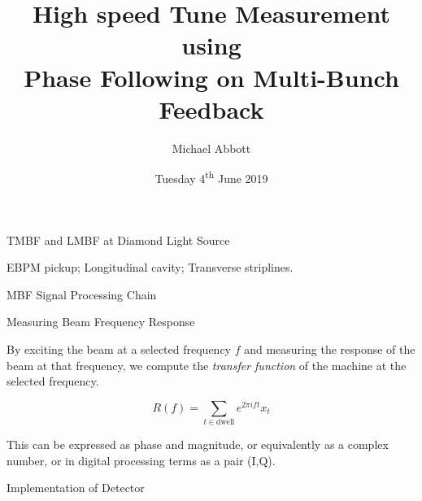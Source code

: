 \documentclass[xcolor=table]{beamer}
\title{%
    High speed Tune Measurement using \\
    Phase Following on Multi-Bunch Feedback}
\author{Michael Abbott}
\institute{Diamond Light Source}
\date{Tuesday 4\textsuperscript{th} June 2019}
\begin{document}
\frame{\titlepage}


%
\begin{frame}{TMBF and LMBF at Diamond Light Source}


\begin{centering}

\end{centering}

\bigskip
{} EBPM pickup;
 Longitudinal cavity;
 Transverse striplines.

\end{frame}


%
\begin{frame}{MBF Signal Processing Chain}



\end{frame}


%
\begin{frame}{Measuring Beam Frequency Response}

\begin{centering}

\end{centering}

\bigskip

By exciting the beam at a selected frequency $f$ and measuring the response of
the beam at that frequency, we compute the \emph{transfer function} of the
machine at the selected frequency.

\begin{equation*}
    R(f) = \sum_{t\in\text{dwell}} e^{2\pi i f t} x_t
\end{equation*}

This can be expressed as phase and magnitude, or equivalently as a
complex number, or in digital processing terms as a pair (I,Q).

\end{frame}


%
\begin{frame}{Implementation of Detector}



\end{frame}
\end{document}

